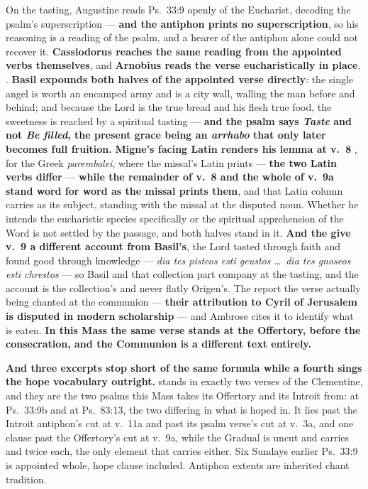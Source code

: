 On the tasting, Augustine reads Ps.\ 33:9 openly of the Eucharist, decoding the
psalm's superscription --- \textbf{and the antiphon prints no superscription},
so his reasoning is a reading of the psalm, and a hearer of the antiphon alone
could not recover it. \textbf{Cassiodorus reaches the
same reading from the appointed verbs themselves}, and \textbf{Arnobius reads
the verse eucharistically in place}, .
\textbf{Basil expounds both halves of the appointed verse directly}: the single
angel is worth an encamped army and  is a city wall, walling
the man before and behind; and because the Lord is the true bread and his flesh
true food, the sweetness is reached by a spiritual tasting --- \textbf{and the
psalm says \emph{Taste} and not \emph{Be filled}, the present grace being an
\emph{arrhabo} that only later becomes full fruition.} \textbf{Migne's facing Latin renders his
lemma at v.~8 }, for the Greek
\emph{parembalei}, where the missal's Latin prints  --- \textbf{the two Latin verbs differ} --- \textbf{while the
remainder of v.~8 and the whole of v.~9a stand word for word as the missal
prints them}, and that Latin column carries  as its
subject, standing with the missal at the disputed noun. Whether he intends the
eucharistic species specifically or the spiritual apprehension of the Word is
not settled by the passage, and both halves stand in it. \textbf{And the
 give v.~9 a different account from Basil's}, the Lord
tasted through faith and found good through knowledge --- \emph{dia tes pisteos
esti geustos \dots\ dia tes gnoseos esti chrestos} --- so Basil and that
collection part company at the tasting, and the account is the collection's and
never flatly Origen's. The
 report the verse actually being chanted at the
communion --- \textbf{their attribution to Cyril of Jerusalem is disputed in
modern scholarship} --- and Ambrose cites it to identify what is eaten.
\textbf{In this Mass the same verse stands at the Offertory, before the
consecration, and the Communion is a different text entirely.}

\textbf{And three excerpts stop short of the same formula while a fourth sings
the hope vocabulary outright.}  stands in
exactly two verses of the Clementine, and they are the two psalms this Mass
takes its Offertory and its Introit from:  at
Ps.\ 33:9b and  at Ps.\ 83:13, the two
differing in what is hoped in. It lies past the
Introit antiphon's cut at v.~11a and past its psalm verse's cut at v.~3a, and
one clause past the Offertory's cut at v.~9a, while the Gradual is uncut and
carries  and  twice each, the only element that
carries either. Six Sundays earlier Ps.\ 33:9 is appointed whole, hope clause
included. Antiphon extents are inherited chant tradition.

